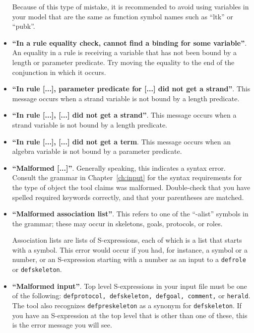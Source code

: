 \begin{itemize}
  Because of this type of mistake, it is recommended to avoid using variables
  in your model that are the same as function symbol names such as
  ``ltk'' or ``pubk''.

\item \textbf{``In a rule equality check, cannot find a binding for
  some variable''}.  An equality in a rule is receiving a variable
  that has not been bound by a length or parameter predicate.  Try
  moving the equality to the end of the conjunction in which it
  occurs.

\item \textbf{``In rule [...], parameter predicate for [...] did not
  get a strand''}.  This message occurs when a strand variable is not
  bound by a length predicate.

\item \textbf{``In rule [...], [...] did not get a strand''}.
  This message occurs when a strand variable is not bound by a length
  predicate.

\item \textbf{``In rule [...], [...] did not get a term}.  This
  message occurs when an algebra variable is not bound by a parameter
  predicate.

\item \textbf{``Malformed [...]''}.  Generally speaking, this indicates
  a syntax error.  Consult the grammar in Chapter~\ref{ch:input} for the
  syntax requirements for the type of object the tool claims was malformed.
  Double-check that you have spelled required keywords correctly, and that
  your parentheses are matched.

\item \textbf{``Malformed association list''}.  This refers to one of
  the ``-alist'' symbols in the grammar; these may occur in skeletons,
  goals, protocols, or roles.

  Association lists are lists of S-expressions, each of which is a
  list that starts with a symbol.  This error would occur if you had,
  for instance, a symbol or a number, or an S-expression starting with
  a number as an input to a \texttt{defrole} or \texttt{defskeleton}.

\item \textbf{``Malformed input''}.  Top level S-expressions in your
  input file must be one of the following: \texttt{defprotocol,
    defskeleton, defgoal, comment,} or \texttt{herald}.  The tool also
  recognizes \texttt{defpreskeleton} as a synonym for
  \texttt{defskeleton}.  If you have an S-expression at the top level
  that is other than one of these, this is the error message you will
  see.


\end{itemize}
